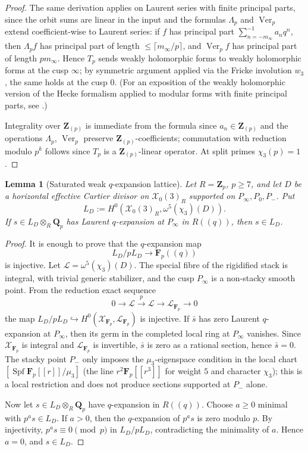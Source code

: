 \documentclass[11pt]{amsart}
\newtheorem{lemma}[theorem]{Lemma}
\theoremstyle{definition}
\theoremstyle{remark}
\newcommand{\Q}{\mathbf{Q}}
\newcommand{\Z}{\mathbf{Z}}
\newcommand{\Fp}{\mathbf{F}_p}
\begin{document}
\begin{proof}
The same derivation applies on Laurent series with finite principal parts, since the orbit sums are linear in the input and the formulas $\Lambda_p$ and $\operatorname{Ver}_p$ extend coefficient-wise to Laurent series: if $f$ has principal part $\sum_{n=-m_\infty}^{-1}a_nq^n$, then $\Lambda_p f$ has principal part of length $\le \lceil m_\infty/p\rceil$, and $\operatorname{Ver}_p f$ has principal part of length $pm_\infty$. Hence $T_p$ sends weakly holomorphic forms to weakly holomorphic forms at the cusp $\infty$; by symmetric argument applied via the Fricke involution $w_3$, the same holds at the cusp $0$. (For an exposition of the weakly holomorphic version of the Hecke formalism applied to modular forms with finite principal parts, see \cite[\S 2]{Guerzhoy08}.)

Integrality over $\Z_{(p)}$ is immediate from the formula since $a_n\in\Z_{(p)}$ and the operations $\Lambda_p$, $\operatorname{Ver}_p$ preserve $\Z_{(p)}$-coefficients; commutation with reduction modulo $p^k$ follows since $T_p$ is a $\Z_{(p)}$-linear operator. At split primes $\chi_3(p)=1$.
\end{proof}

\begin{lemma}[Saturated weak $q$-expansion lattice]\label{lem:weak-q-saturation}
Let $R=\Z_p$, $p\ge 7$, and let $D$ be a horizontal effective Cartier divisor on $\mathcal X_0(3)_R$ supported on $P_\infty,P_0,P_-$. Put
\[
L_D:=H^0(\mathcal X_0(3)_R,\omega^5(\chi_3)(D)).
\]
If $s\in L_D\otimes_R\Q_p$ has Laurent $q$-expansion at $P_\infty$ in $R((q))$, then $s\in L_D$.
\end{lemma}

\begin{proof}
It is enough to prove that the $q$-expansion map
\[
L_D/pL_D\longrightarrow \Fp((q))
\]
is injective. Let $\mathcal L=\omega^5(\chi_3)(D)$. The special fibre of the rigidified stack is integral, with trivial generic stabilizer, and the cusp $P_\infty$ is a non-stacky smooth point. From the reduction exact sequence
\[
0\longrightarrow \mathcal L \xrightarrow{p} \mathcal L \longrightarrow \mathcal L_{\Fp}\longrightarrow 0
\]
the map $L_D/pL_D\hookrightarrow H^0(\mathcal X_{\Fp},\mathcal L_{\Fp})$ is injective. If $\bar s$ has zero Laurent $q$-expansion at $P_\infty$, then its germ in the completed local ring at $P_\infty$ vanishes. Since $\mathcal X_{\Fp}$ is integral and $\mathcal L_{\Fp}$ is invertible, $\bar s$ is zero as a rational section, hence $\bar s=0$. The stacky point $P_-$ only imposes the $\mu_3$-eigenspace condition in the local chart $[\operatorname{Spf}\Fp[[r]]/\mu_3]$ (the line $r^2\Fp[[r^3]]$ for weight $5$ and character $\chi_3$); this is a local restriction and does not produce sections supported at $P_-$ alone.

Now let $s\in L_D\otimes_R\Q_p$ have $q$-expansion in $R((q))$. Choose $a\ge 0$ minimal with $p^a s\in L_D$. If $a>0$, then the $q$-expansion of $p^a s$ is zero modulo $p$. By injectivity, $p^a s\equiv0\pmod p$ in $L_D/pL_D$, contradicting the minimality of $a$. Hence $a=0$, and $s\in L_D$.
\end{proof}
\end{document}
